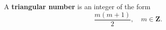 A \textbf{triangular number} is an integer of the form
$$
\frac{m(m+1)}{2}, \quad m \in \mathbf{Z}.
$$

